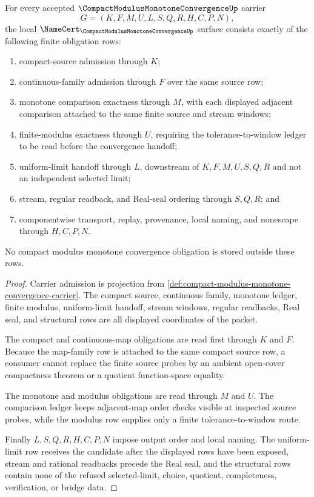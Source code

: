 \begin{theorem}
\label{thm:compact-modulus-monotone-convergence-obligations}
For every accepted $\CompactModulusMonotoneConvergenceUp$ carrier
$$
G=(K,F,M,U,L,S,Q,R,H,C,P,N),
$$
the local $\NameCert_{\CompactModulusMonotoneConvergenceUp}$ surface consists exactly of the following finite obligation rows:
\begin{enumerate}
\item compact-source admission through $K$;
\item continuous-family admission through $F$ over the same source row;
\item monotone comparison exactness through $M$, with each displayed adjacent comparison attached to the same finite source and stream windows;
\item finite-modulus exactness through $U$, requiring the tolerance-to-window ledger to be read before the convergence handoff;
\item uniform-limit handoff through $L$, downstream of $K,F,M,U,S,Q,R$ and not an independent selected limit;
\item stream, regular readback, and Real-seal ordering through $S,Q,R$; and
\item componentwise transport, replay, provenance, local naming, and nonescape through $H,C,P,N$.
\end{enumerate}
No compact modulus monotone convergence obligation is stored outside these rows.
\end{theorem}
\begin{proof}
Carrier admission is projection from \autoref{def:compact-modulus-monotone-convergence-carrier}. The compact source, continuous family, monotone ledger, finite modulus, uniform-limit handoff, stream windows, regular readbacks, Real seal, and structural rows are all displayed coordinates of the packet.

The compact and continuous-map obligations are read first through $K$ and $F$. Because the map-family row is attached to the same compact source row, a consumer cannot replace the finite source probes by an ambient open-cover compactness theorem or a quotient function-space equality.

The monotone and modulus obligations are read through $M$ and $U$. The comparison ledger keeps adjacent-map order checks visible at inspected source probes, while the modulus row supplies only a finite tolerance-to-window route.

Finally $L,S,Q,R,H,C,P,N$ impose output order and local naming. The uniform-limit row receives the candidate after the displayed rows have been exposed, stream and rational readbacks precede the Real seal, and the structural rows contain none of the refused selected-limit, choice, quotient, completeness, verification, or bridge data.
\end{proof}

